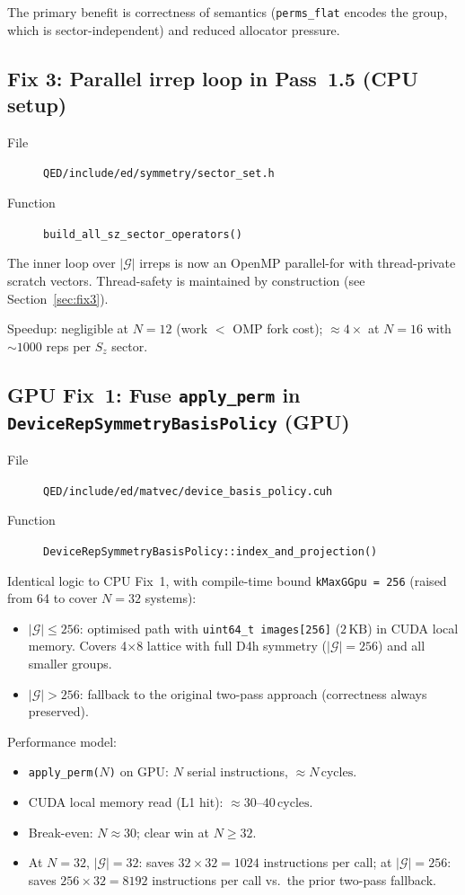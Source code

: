 \documentclass[11pt,a4paper]{article}
\begin{document}
The primary benefit is correctness of semantics (\texttt{perms\_flat} encodes
the group, which is sector-independent) and reduced allocator pressure.

\subsection{Fix 3: Parallel irrep loop in Pass~1.5 (CPU setup)}

\begin{description}
  \item[File] \texttt{QED/include/ed/symmetry/sector\_set.h}
  \item[Function] \texttt{build\_all\_sz\_sector\_operators()}
\end{description}

The inner loop over $|\mathcal{G}|$ irreps is now an OpenMP parallel-for with
thread-private scratch vectors.  Thread-safety is maintained by construction
(see Section~\ref{sec:fix3}).

Speedup: negligible at $N=12$ (work $<$ OMP fork cost); $\approx 4\times$
at $N=16$ with $\sim 1000$ reps per $S_z$ sector.

\subsection{GPU Fix~1: Fuse \texttt{apply\_perm} in \texttt{DeviceRepSymmetryBasisPolicy} (GPU)}

\begin{description}
  \item[File] \texttt{QED/include/ed/matvec/device\_basis\_policy.cuh}
  \item[Function] \texttt{DeviceRepSymmetryBasisPolicy::index\_and\_projection()}
\end{description}

Identical logic to CPU Fix~1, with compile-time bound \texttt{kMaxGGpu = 256}
(raised from 64 to cover $N=32$ systems):
\begin{itemize}[nosep]
  \item $|\mathcal{G}| \le 256$: optimised path with \texttt{uint64\_t images[256]}
    ($2\,\mathrm{KB}$) in CUDA local memory.  Covers 4$\times$8 lattice with full
    D4h symmetry ($|\mathcal{G}| = 256$) and all smaller groups.
  \item $|\mathcal{G}| > 256$: fallback to the original two-pass approach
    (correctness always preserved).
\end{itemize}

Performance model:
\begin{itemize}[nosep]
  \item \texttt{apply\_perm($N$)} on GPU: $N$ serial instructions, $\approx N\,\mathrm{cycles}$.
  \item CUDA local memory read (L1 hit): $\approx 30$--$40\,\mathrm{cycles}$.
  \item Break-even: $N \approx 30$; clear win at $N \ge 32$.
  \item At $N=32$, $|\mathcal{G}|=32$: saves $32 \times 32 = 1024$
    instructions per call; at $|\mathcal{G}|=256$: saves $256\times32=8192$
    instructions per call vs.\ the prior two-pass fallback.
\end{itemize}
\end{document}
